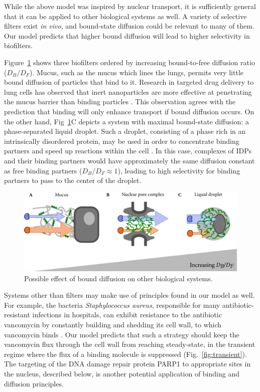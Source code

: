 While the above model was inspired by nuclear transport, it is sufficiently general that it can be applied to other biological systems as well.  A variety of selective filters exist \textit{in vivo}, and bound-state diffusion could be relevant to many of them.  Our model predicts that higher bound diffusion will lead to higher selectivity in biofilters.  

Figure~\ref{fig:other-filters} shows three biofilters ordered by increasing bound-to-free diffusion ratio ($D_B/D_F$).  Mucus, such as the mucus which lines the lungs, permits very little bound diffusion of particles that bind to it.  Research in targeted drug delivery to lung cells has observed that inert nanoparticles are more effective at penetrating the mucus barrier than binding particles \cite{witten17}.  This observation agrees with the prediction that binding will only enhance transport if bound diffusion occurs.   On the other hand, Fig~\ref{fig:other-filters}C depicts a system with maximal bound-state diffusion: a phase-separated liquid droplet.  Such a droplet, consisting of a phase rich in an intrinsically disordered protein, may be used in order to concentrate binding partners and speed up reactions within the cell \cite{brangwynne15, feric16}.  In this case, complexes of IDPs and their binding partners would have approximately the same diffusion constant as free binding partners ($D_B/D_F \approx 1$), leading to high selectivity for binding partners to pass to the center of the droplet.

\begin{figure}
\centering
\includegraphics[width=0.8\linewidth]{figs/ch02/concluding-cartoon-large.pdf}
\caption{Possible effect of bound diffusion on other biological systems.}
\label{fig:other-filters}
\end{figure}

Systems other than filters may make use of principles found in our model as well.  For example, the bacteria \textit{Staphylococcus aureus}, responsible for many antibiotic-resistant infections in hospitals, can exhibit resistance to the antibiotic vancomycin by constantly building and shedding its cell wall, to which vancomycin binds \cite{mcguinness17}.  Our model predicts that such a strategy should keep the vancomycin flux through the cell wall from reaching steady-state, in the transient regime where the flux of a binding molecule is suppressed (Fig.~\ref{fig:transient}).  The targeting of the DNA damage repair protein PARP1 to appropriate sites in the nucleus, described below, is another potential application of binding and diffusion principles.

